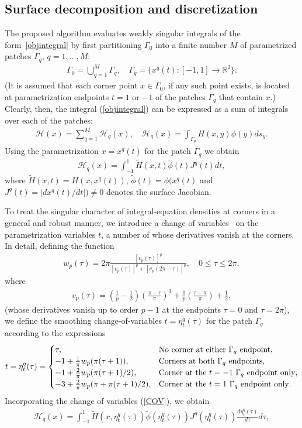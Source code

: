 \documentclass[10pt]{article}
\numberwithin{equation}{section}
\newcommand{\R}{{\mathbb R}}
\newcommand{\be}{\begin{eqnarray}}
\newcommand{\ben}{\begin{eqnarray*}}
\newcommand{\en}{\end{eqnarray}}
\newcommand{\enn}{\end{eqnarray*}}
\begin{document}
\subsection{Surface decomposition and discretization}
\label{sec:4.2}

The proposed algorithm evaluates weakly singular integrals of the
form~\eqref{objintegral} by first partitioning $\Gamma_0$ into a
finite number $M$ of parametrized patches $\Gamma_q$, $q=1,\dots,M$:
\ben \Gamma_0=\bigcup_{q=1}^M\Gamma_q,\quad \Gamma_q=\{x^q(t): [-1,1]
\rightarrow \R^2\}.  \enn (It is assumed that each corner point
$x\in \Gamma_0$, if any such point exists, is located at
parametrization endpoints $t=1$ or $-1$ of the patches $\Gamma_q$ that
contain $x$.)  Clearly, then, the integral (\ref{objintegral}) can be
expressed as a sum of integrals over each of the patches: \ben
\mathcal{H}(x)= \sum_{q=1}^M \mathcal{H}_q(x),\quad \mathcal{H}_q(x)=
\int_{\Gamma_q} H(x,y)\phi(y)ds_y.  \enn Using the parametrization
$x = x^q(t)$ for the patch $\Gamma_q$ we obtain \be
\label{objintegral1}
\mathcal{H}_q(x)= \int_{-1}^1 \widetilde{H}(x,t)\widetilde{\phi}(t)J^q(t)dt,
\en
where $\widetilde{H}(x,t)=H(x,x^q(t))$, $\widetilde{\phi}(t)=\phi(x^q(t)$ and $J^q(t)=|dx^q(t)/dt|)\ne 0$ denotes the surface Jacobian.

To treat the singular character of integral-equation densities at
corners in a general and robust manner, we introduce a change of
variables~\cite{BG18} on the parametrization variables $t$, a number
of whose derivatives vanish at the corners. In detail, defining the
function \ben
w_p(\tau)=2\pi\frac{[v_p(\tau)]^p}{[v_p(\tau)]^p+[v_p(2\pi-\tau)]^p},\quad
0\le\tau\le2\pi, \enn where \ben
v_p(\tau)=\left(\frac{1}{p}-\frac{1}{2}\right)\left(\frac{\pi-\tau}{\pi}\right)^3
+\frac{1}{p}\left(\frac{\tau-\pi}{\pi}\right) +\frac{1}{2}, \enn
(whose derivatives vanish up to order $p-1$ at the endpoints $\tau=0$
and $\tau=2\pi$), we define the smoothing change-of-variables
$t=\eta_t^q(\tau)$ for the patch $\Gamma_q$ according to the 
expressions 
\be
\label{COV}
t=\eta_t^q(\tau)=\begin{cases}
\tau, & \mbox{No corner at either $\Gamma_q$ endpoint}, \cr
-1+ \frac{1}{\pi}w_p(\pi(\tau+1)), & \mbox{Corners at both $\Gamma_q$ endpoints}, \cr
-1+ \frac{2}{\pi}w_p(\pi(\tau+1)/2), & \mbox{Corner at the $t=-1$ $\Gamma_q$ endpoint only}, \cr
-3+ \frac{2}{\pi}w_p(\pi+\pi(\tau+1)/2), & \mbox{Corner at the $t=1$ $\Gamma_q$ endpoint only}.
\end{cases}
\en
Incorporating the change of variables (\ref{COV}), we obtain
\be
\label{objintegral2}
\mathcal{H}_q(x)= \int_{-1}^1 \widetilde{H}(x,\eta_t^q(\tau))\widetilde{\phi}(\eta_t^q(\tau)) J^q(\eta_t^q(\tau)) \frac{d\eta_t^q(\tau)}{d\tau}d\tau,
\en
\end{document}
